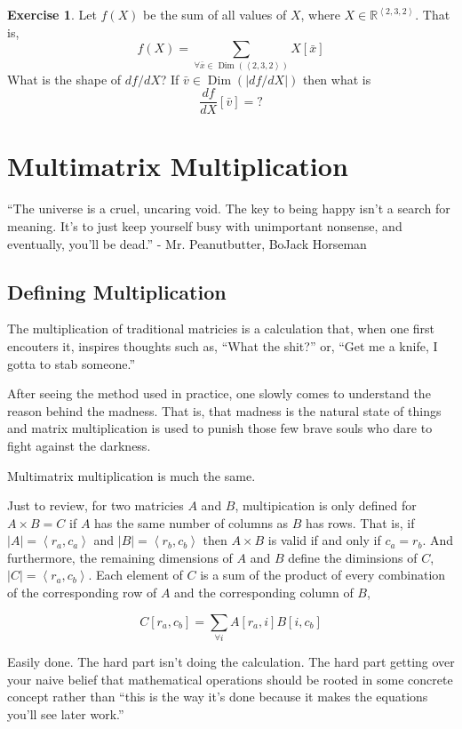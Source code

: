 \documentclass[12pt]{book}
\theoremstyle{definition}
\newtheorem{exercise}{Exercise}[chapter]
\theoremstyle{plain}
\theoremstyle{ppart}
\theoremstyle{case}
\theoremstyle{solution}
\DeclareMathOperator{\Dim}{Dim}
\begin{document}
\begin{exercise}
Let $f(X)$ be the sum of all values of $X$, where
$X \in \mathbb{R}^{\left<2,3,2\right>}$. That is,
\[ f(X) = \sum_{\forall \bar{x} \in \Dim(\left<2,3,2\right>)} X[\bar{x}] \]
What is the shape of $df/dX$? If $\bar{v} \in \Dim(|df/dX|)$ then what is
\[ \frac{df}{dX}[\bar{v}] = ? \]
\end{exercise}

\chapter{Multimatrix Multiplication}

\begin{displayquote}
``The universe is a cruel, uncaring void. The key to being happy isn't a search
for meaning. It's to just keep yourself busy with unimportant nonsense, and eventually,
you'll be dead.'' - Mr. Peanutbutter, BoJack Horseman
\end{displayquote}

\section{Defining Multiplication}

The multiplication of traditional matricies is a calculation that, when one first
encouters it, inspires thoughts such as, ``What the shit?'' or, ``Get me a knife,
I gotta to stab someone.''

After seeing the method used in practice, one slowly comes to understand the
reason behind the madness. That is, that madness is the natural state of things
and matrix multiplication is used to punish those few brave souls who dare to
fight against the darkness.

Multimatrix multiplication is much the same.

Just to review, for two matricies $A$ and $B$, multipication is only defined
for $A \times B = C$ if $A$ has the same number of columns as $B$ has rows.
That is, if $|A| = \left< r_a, c_a \right>$ and $|B| = \left< r_b, c_b \right>$
then $A \times B$ is valid if and only if $c_a = r_b$. And furthermore,
the remaining dimensions of $A$ and $B$ define the diminsions of $C$,
$|C| = \left< r_a, c_b \right>$. Each element of $C$ is a sum of the product of
every combination of the corresponding row of $A$ and the corresponding column of
$B$,

\[ C[r_a, c_b] = \sum_{\forall i} A[r_a, i] B[i, c_b] \]

Easily done. The hard part isn't doing the calculation. The hard part getting over
your naive belief that mathematical operations should be rooted in some concrete
concept rather than ``this is the way it's done because it makes the equations
you'll see later work.''
\end{document}

